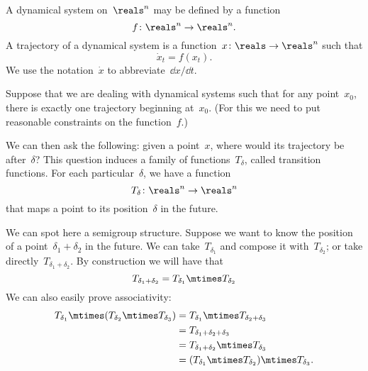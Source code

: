 \begin{example}
    \label{exa:transition-functions}
    \begin{definition}
        \label{def:ct-dynsyst}
        A dynamical system on~$\reals^n$ may be defined by a function
        \begin{equation}
            f\colon \reals^n \to \reals^n.
        \end{equation}
        A trajectory of a dynamical system is a function~$x\colon \reals \to \reals^n$ such that
        \begin{equation}
            \dot{x}_t = f(x_t).
        \end{equation}
        We use the notation~$\dot{x}$ to abbreviate~$\dd x / \dd t$.
    \end{definition}

    Suppose that we are dealing with dynamical systems such that for any point~$x_0$, there
    is exactly one trajectory beginning at~$x_0$. (For this we need to put reasonable constraints
    on the function~$f$.)

    We can then ask the following: given a point~$x$, where would its trajectory be after~$\delta$?
    This question induces a family of functions~$T_\delta$, called transition functions.
    For each particular~$\delta$, we have a function
    \begin{equation*}
        T_{\delta}\colon \reals^n \to  \reals^n
    \end{equation*}
    that maps a point to its position~$\delta$ in the future.

    We can spot here a semigroup structure. Suppose we want to know the position of a point~$\delta_1 + \delta_2$
    in the future. We can take~$T_{\delta_1}$ and compose it with~$T_{\delta_2}$; or take directly~$T_{\delta_1 + \delta_2}$.
    By construction we will have that
    \begin{equation}
        \label{eq:transition-property}
        T_{\delta_1 + \delta_2} = T_{\delta_1} \mtimes T_{\delta_2}
    \end{equation}
    We can also easily prove associativity:
    \begin{equation}
        \begin{aligned}
            T_{\delta_1}\mtimes (T_{\delta_2}\mtimes T_{\delta_3})&=T_{\delta_1}\mtimes T_{\delta_2+\delta_3}\\
            &=T_{\delta_1+\delta_2+\delta_3}\\
            &=T_{\delta_1+\delta_2}\mtimes T_{\delta_3}\\
            &=(T_{\delta_1}\mtimes T_{\delta_2})\mtimes T_{\delta_3}.
        \end{aligned}
    \end{equation}


\end{example}
